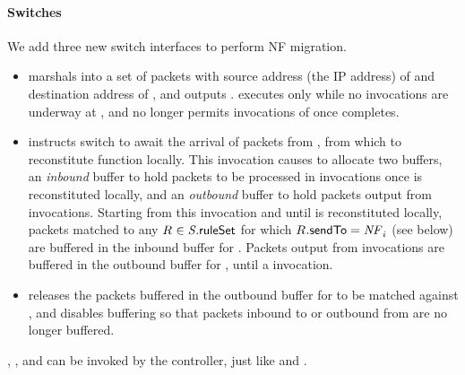 \paragraph{Switches} We add three new switch interfaces to perform NF migration. 
\begin{itemize}[nosep,leftmargin=1em,labelwidth=*,align=left]
\item \switchID{}{\export{\nfIdx}{\switchIdx}} marshals \nfID{\nfIdx}
  into a set \pktSet of packets with source address (the IP address)
  of \switchID{} and destination address of \switchID{\switchIdx}, and
  outputs \pktSet.  \switchID{}{\export{\nfIdx}{\switchIdx}} executes
  only while no \nfID{\nfIdx}{}{\processPkt} invocations are underway
  at \switchID{}, and \switchID{} no longer permits invocations of
  \nfID{\nfIdx}{}{\processPkt} once
  \switchID{}{\export{\nfIdx}{\switchIdx}} completes.
\item \switchID{}{{\switchIdx}} instructs switch
  \switchID{} to await the arrival of packets \pktSet from
  \switchID{\switchIdx}, from which to reconstitute function
  \nfID{\nfIdx} locally.  This invocation causes \switchID{\switchIdx}
  to allocate two buffers, an \textit{inbound} buffer to hold packets
  to be processed in \nfID{\nfIdx}{}{\processPkt} invocations once
  \nfID{\nfIdx}{} is reconstituted locally, and an \textit{outbound}
  buffer to hold packets output from \nfID{\nfIdx}{}{\processPkt}
  invocations.  Starting from this invocation and until \nfID{\nfIdx}
  is reconstituted locally, packets matched to any $\ruleID{} \in
  \switchID{}{\ruleSet}$ for which $\ruleID{}{\sendToField} =
  \nfID{\nfIdx}{}$ (see below) are buffered in the inbound buffer for
  \nfID{\nfIdx}{}.  Packets output from \nfID{\nfIdx}{}{\processPkt}
  invocations are buffered in the outbound buffer for \nfID{\nfIdx},
  until a \switchID{}{\release{\nfIdx}} invocation.
\item \switchID{}{\release{\nfIdx}} releases the packets buffered in
  the outbound buffer for \nfID{\nfIdx} to be matched against
  , and disables buffering so that packets
  inbound to or outbound from \nfID{\nfIdx}{} are no longer buffered.
\end{itemize}
\switchID{}{}, \switchID{}{\export}, and \switchID{}{\release}
can be invoked by the controller, just like \switchID{}{\flowAdd} and
\switchID{}{\flowDel}.

